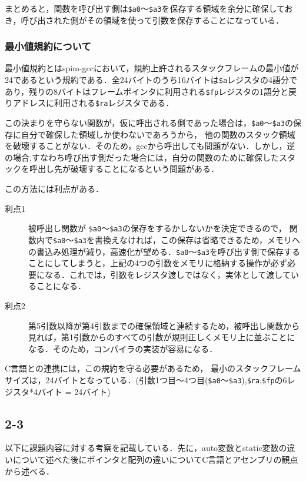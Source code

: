 \documentclass[a4j,11pt]{jarticle}
\begin{document}
まとめると，関数を呼び出す側は\verb|$a0|〜\verb|$a3|を保存する領域を余分に確保しておき，呼び出された側がその領域を使って引数を保存することになっている．

\subsubsection{最小値規約について}
最小値規約とはspim-gccにおいて，規約上許されるスタックフレームの最小値が24であるという規約である．全24バイトのうち16バイトは\verb|$a|レジスタの4語分であり，残りの8バイトはフレームポインタに利用される\verb|$fp|レジスタの1語分と戻りアドレスに利用される\verb|$ra|レジスタである．

この決まりを守らない関数が，仮に呼出される側であった場合は，\verb|$a0|〜\verb|$a3|の保存に自分で確保した領域しか使わないであろうから， 他の関数のスタック領域を破壊することがない．そのため，gccから呼出しても問題がない．しかし，逆の場合,すなわち呼び出す側だった場合には，自分の関数のために確保したスタックを呼出し先が破壊することになるという問題がある．

この方法には利点がある．
\begin{description}
\item[利点1]被呼出し関数が \verb|$a0|〜\verb|$a3|の保存をするかしないかを決定できるので， 関数内で\verb|$a0|〜\verb|$a3|を書換えなければ，この保存は省略できるため，メモリへの書込み処理が減り，高速化が望める．\verb|$a0|〜\verb|$a3|を呼び出す側で保存することにしてしまうと，上記の4つの引数をメモリに格納する操作が必ず必要になる．これでは，引数をレジスタ渡しではなく，実体として渡していることになる．
\item[利点2]第5引数以降が第4引数までの確保領域と連続するため，被呼出し関数から見れば，第1引数からのすべての引数が規則正しくメモリ上に並ぶことになる．そのため，コンパイラの実装が容易になる．
\end{description}
C言語との連携には，この規約を守る必要があるため， 最小のスタックフレームサイズは，24バイトとなっている．(引数1つ目〜4つ目(\verb|$a0|〜\verb|$a3|),\verb|$ra|,\verb|$fp|の6レジスタ*4バイト = 24バイト) 
 \subsection{2-3}
以下に課題内容に対する考察を記載している．先に，auto変数とstatic変数の違いについて述べた後にポインタと配列の違いについてC言語とアセンブリの観点から述べる．
\end{document}
